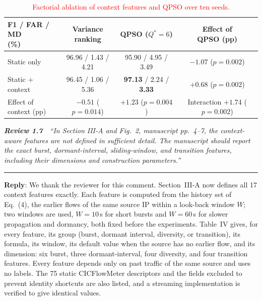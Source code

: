 \documentclass[11pt]{article}
\newcommand{\review}[2]{\par\bigskip\noindent\textbf{\textit{Review #1}}\ \ \textit{``#2''}\par\smallskip\hrule\medskip}
\newcommand{\reply}{\noindent\textbf{Reply}: }
\begin{document}
\setcounter{table}{9}
\begin{table}[H]
\centering
\scriptsize
\caption{\textcolor{red}{Factorial ablation of context features and QPSO over ten seeds.}}

\color{red}
\setlength{\tabcolsep}{3pt}
\begin{adjustbox}{max width=\linewidth}
\begin{tabular}{lccc}
\hline\toprule
\makecell[l]{F1 / FAR / MD\\(\%)} & \makecell{Variance\\ranking} & \makecell{QPSO\\($Q^{*}{=}6$)} & \makecell{Effect of\\QPSO (pp)} \\
\hline\toprule
Static only & 96.96 / 1.43 / 4.21 & 95.90 / 4.95 / 3.49 & \makecell{$-1.07$\\($p{=}0.002$)} \\
\makecell[l]{Static +\\context} & 96.45 / 1.06 / 5.36 & \textbf{97.13} / 2.24 / \textbf{3.33} & \makecell{$+0.68$\\($p{=}0.002$)} \\
\midrule
\makecell[l]{Effect of\\context (pp)} & \makecell{$-0.51$\\($p{=}0.014$)} & \makecell{$+1.23$\\($p{=}0.004$)} & \makecell{Interaction\\$+1.74$\\($p{=}0.002$)} \\
\hline\toprule
\end{tabular}
\end{adjustbox}
\end{table}

\review{1.7}{In Section III-A and Fig.~2, manuscript pp.~4--7, the context-aware features are not defined in sufficient detail. The manuscript should report the exact burst, dormant-interval, sliding-window, and transition features, including their dimensions and construction parameters.}

\reply We thank the reviewer for this comment. Section~III-A now defines all
17 context features exactly. Each feature is computed from the history set of
Eq.~(4), the earlier flows of the same source IP within a look-back window
$W$; two windows are used, $W=10$\,s for short bursts and $W=60$\,s for slower
propagation and dormancy, both fixed before the experiments. Table~IV gives,
for every feature, its group (burst, dormant interval, diversity, or
transition), its formula, its window, its default value when the source has
no earlier flow, and its dimension: six burst, three dormant-interval, four
diversity, and four transition features. Every feature depends only on past
traffic of the same source and uses no labels. The 75 static CICFlowMeter
descriptors and the fields excluded to prevent identity shortcuts are also
listed, and a streaming implementation is verified to give identical values.
\end{document}
